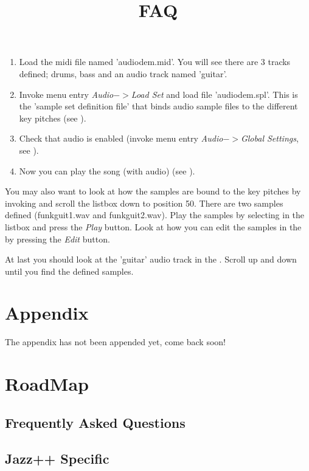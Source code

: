 \documentclass[letterpaper]{report}
\begin{document}
\begin{enumerate}

\item Load the midi file named 'audiodem.mid'. You will see there are 3 tracks
defined; drums, bass and an audio track named 'guitar'.

\item Invoke menu entry {\em Audio$->$Load Set} and load file 'audiodem.spl'.
This is the 'sample set definition file' that binds audio sample files to
the different key pitches (see ).

\item Check that audio is enabled (invoke menu entry
{\em Audio$->$Global Settings}, see ).

\item Now you can play the song (with audio) (see
).

\end{enumerate}

You may also want to look at how the samples are bound to the key pitches by
invoking
 and scroll the listbox down to
position 50. There are two samples defined (funkguit1.wav and funkguit2.wav).
Play the samples by selecting in the listbox and press the {\em Play} button.
Look at how you can edit the samples in the
 by pressing the {\em Edit} button.

At last you should look at the 'guitar' audio track in the
. Scroll
up and down until you find the defined samples.



\chapter{Appendix}\label{appendix}
The appendix has not been appended yet, come back soon!

\chapter{RoadMap}

\section{Frequently Asked Questions}\title{FAQ}

\section{Jazz++ Specific}
\end{document}
